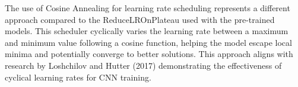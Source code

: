 \documentclass[a4paper,12pt]{article}
\begin{document}
The use of Cosine Annealing for learning rate scheduling represents a different approach compared to the ReduceLROnPlateau used with the pre-trained models. This scheduler cyclically varies the learning rate between a maximum and minimum value following a cosine function, helping the model escape local minima and potentially converge to better solutions. This approach aligns with research by Loshchilov and Hutter (2017) demonstrating the effectiveness of cyclical learning rates for CNN training.








\newpage


\end{document}
